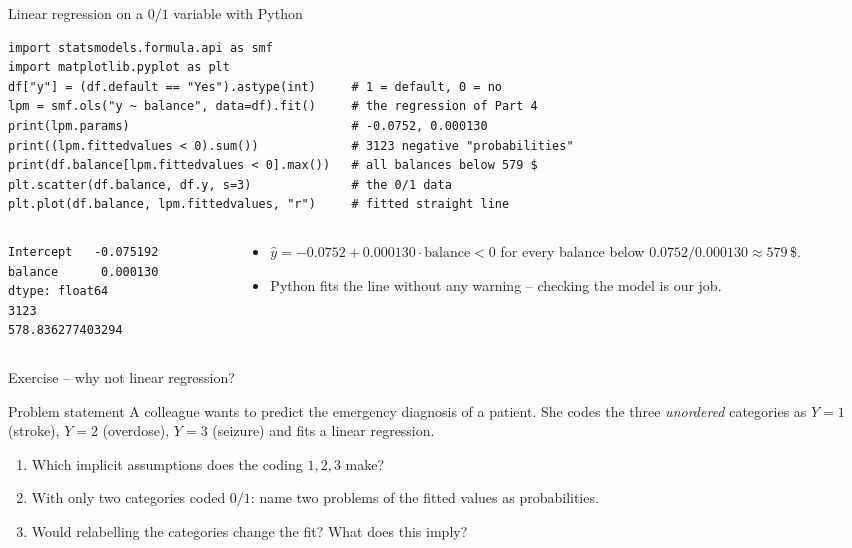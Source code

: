 \documentclass[aspectratio=169,11pt]{beamer}
\begin{document}
\begin{frame}[fragile]{Linear regression on a $0/1$ variable with Python}
\begin{lstlisting}
import statsmodels.formula.api as smf
import matplotlib.pyplot as plt
df["y"] = (df.default == "Yes").astype(int)     # 1 = default, 0 = no
lpm = smf.ols("y ~ balance", data=df).fit()     # the regression of Part 4
print(lpm.params)                               # -0.0752, 0.000130
print((lpm.fittedvalues < 0).sum())             # 3123 negative "probabilities"
print(df.balance[lpm.fittedvalues < 0].max())   # all balances below 579 $
plt.scatter(df.balance, df.y, s=3)              # the 0/1 data
plt.plot(df.balance, lpm.fittedvalues, "r")     # fitted straight line
\end{lstlisting}
  \begin{columns}[T]
    \begin{column}{0.36\textwidth}
\begin{lstlisting}[style=Pyout]
Intercept   -0.075192
balance      0.000130
dtype: float64
3123
578.836277403294
\end{lstlisting}
    \end{column}
    \begin{column}{0.62\textwidth}
      \small
      \begin{itemize}\setlength{\itemsep}{2pt}
        \item $\hat y=-0.0752+0.000130\cdot\text{balance}<0$ for every
              balance below $0.0752/0.000130\approx579$\,\$.
        \item Python fits the line without any warning -- checking the
              model is our job.
      \end{itemize}
    \end{column}
  \end{columns}
\end{frame}

\begin{frame}{Exercise -- why not linear regression?}
  \begin{block}{Problem statement}
    A colleague wants to predict the emergency diagnosis of a patient. She
    codes the three \emph{unordered} categories as $Y=1$ (stroke), $Y=2$
    (overdose), $Y=3$ (seizure) and fits a linear regression.
    \begin{enumerate}
      \item Which implicit assumptions does the coding $1,2,3$ make?
      \item With only two categories coded $0/1$: name two problems of the
            fitted values as probabilities.
      \item Would relabelling the categories change the fit? What does this
            imply?
    \end{enumerate}
  \end{block}
\end{frame}
\end{document}
